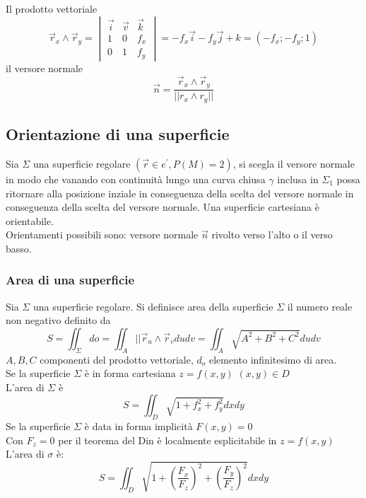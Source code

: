\documentclass{book}
\begin{document}
Il prodotto vettoriale 
\begin{equation*}
	\vec{r}_x\wedge \vec{r}_y=\begin{vmatrix}
		\vec{i} & \vec{v} &\vec{k}\\
		1 & 0 & f_x\\
		0 & 1 &f_y
	\end{vmatrix}=-f_x\vec{i}-f_y\vec{j}+k=(-f_x;-f_y;1)
\end{equation*}
il versore normale
\begin{equation*}
	\vec{n}=\frac{\vec{r}_x\wedge \vec{r}_y}{||r_x\wedge r_y||}
\end{equation*}
\subsection{Orientazione di una superficie}
Sia $\Sigma$ una superficie regolare $(\vec{r}\in e^\prime, P(M)=2)$, si
scegla il versore normale in modo che vanando con continuità lungo una curva
chiusa $\gamma$ inclusa in $\Sigma_1$ possa ritornare alla posizione inziale in
conseguenza della scelta del versore normale in conseguenza della scelta del
versore normale. Una superficie cartesiana è orientabile.\\
Orientamenti possibili sono: versore normale $\vec{n}$ rivolto verso l'alto o
il verso basso. 
\subsubsection{Area di una superficie}
Sia $\Sigma$ una superficie regolare. Si definisce {\color{red}area della
superficie} $\Sigma$ il numero reale non negativo definito da
\begin{equation*}
	S=\iint_\Sigma d o = \iint_A||\vec{r}_u\wedge
	\vec{r}_vdudv=\iint_A\sqrt{A^2+B^2+C^2}dudv
\end{equation*}
$A,B,C$ componenti del prodotto vettoriale, $d_o$ elemento infinitesimo di
area.\\
Se la superficie $\Sigma$ è in forma cartesiana $z=f(x,y)$ $(x,y)\in D$\\
L'area di $\Sigma$ è
\begin{equation*}
	S=\iint_D \sqrt{1+f_x^2+f_y^2} dxdy
\end{equation*}
Se la superficie $\Sigma$ è data in forma implicità $F(x,y)=0$\\
Con $F_z=0$ per il teorema del Din è localmente esplicitabile in $z=f(x,y)$\\
L'area di $\sigma$ è:
\begin{equation*}
	S=\iint_D\sqrt{1+\left(\frac{F_x}{F_z}\right)^2+\left(\frac{F_y}{F_z}\right)^2}dxdy
\end{equation*}
\end{document}

